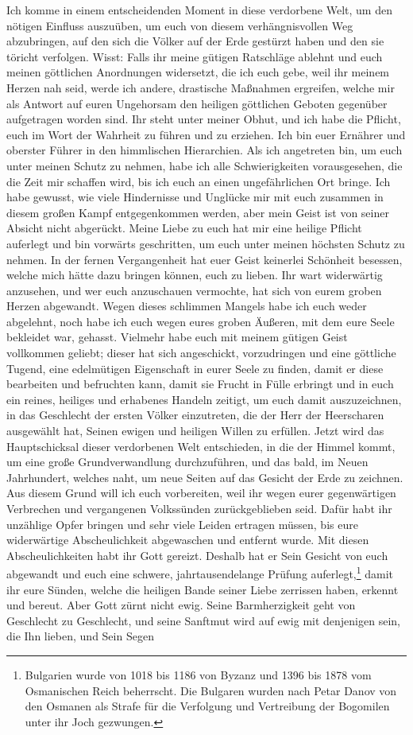 Ich komme in einem entscheidenden Moment in diese verdorbene Welt, um den nötigen Einfluss auszuüben, um euch von diesem verhängnisvollen Weg abzubringen, auf den sich die Völker auf der Erde gestürzt haben und den sie töricht verfolgen. Wisst: Falls ihr meine gütigen Ratschläge ablehnt und euch meinen göttlichen Anordnungen widersetzt, die ich euch gebe, weil ihr meinem Herzen nah seid, werde ich andere, drastische Maßnahmen ergreifen, welche mir als Antwort auf euren Ungehorsam den heiligen göttlichen Geboten gegenüber aufgetragen worden sind. Ihr steht unter meiner Obhut, und ich habe die Pflicht, euch im Wort der Wahrheit zu führen und zu erziehen. Ich bin euer Ernährer und oberster Führer in den himmlischen Hierarchien. Als ich angetreten bin, um euch unter meinen Schutz zu nehmen, habe ich alle Schwierigkeiten vorausgesehen, die die Zeit mir schaffen wird, bis ich euch an einen ungefährlichen Ort bringe. Ich habe gewusst, wie viele Hindernisse und Unglücke mir mit euch zusammen in diesem großen Kampf entgegenkommen werden, aber mein Geist ist von seiner Absicht nicht abgerückt. Meine Liebe zu euch hat mir eine heilige Pflicht auferlegt und bin vorwärts geschritten, um euch unter meinen höchsten Schutz zu nehmen. In der fernen Vergangenheit hat euer Geist keinerlei Schönheit besessen, welche mich hätte dazu bringen können, euch zu lieben. Ihr wart widerwärtig anzusehen, und wer euch anzuschauen vermochte, hat sich von eurem groben Herzen abgewandt. Wegen dieses schlimmen Mangels habe ich euch weder abgelehnt, noch habe ich euch wegen eures groben Äußeren, mit dem eure Seele bekleidet war, gehasst. Vielmehr habe euch mit meinem gütigen Geist vollkommen geliebt; dieser hat sich angeschickt, vorzudringen und eine göttliche Tugend, eine edelmütigen Eigenschaft in eurer Seele zu finden, damit er diese bearbeiten und befruchten kann, damit sie Frucht in Fülle erbringt und in euch ein reines, heiliges und erhabenes Handeln zeitigt, um euch damit auszuzeichnen, in das Geschlecht der ersten Völker einzutreten, die der Herr der Heerscharen ausgewählt hat, Seinen ewigen und heiligen Willen zu erfüllen. Jetzt wird das Hauptschicksal dieser verdorbenen Welt entschieden, in die der Himmel kommt, um eine große Grundverwandlung durchzuführen, und das bald, im Neuen Jahrhundert, welches naht, um neue Seiten auf das Gesicht der Erde zu zeichnen. Aus diesem Grund will ich euch vorbereiten, weil ihr wegen eurer gegenwärtigen Verbrechen und vergangenen Volkssünden zurückgeblieben seid. Dafür habt ihr unzählige Opfer bringen und sehr viele Leiden ertragen müssen, bis eure widerwärtige Abscheulichkeit abgewaschen und entfernt wurde. Mit diesen Abscheulichkeiten habt ihr Gott gereizt. Deshalb hat er Sein Gesicht von euch abgewandt und euch eine schwere, jahrtausendelange Prüfung auferlegt,\footnote{Bulgarien wurde von 1018 bis 1186 von Byzanz und 1396 bis 1878 vom Osmanischen Reich beherrscht. Die Bulgaren wurden nach Petar Danov von den Osmanen als Strafe für die Verfolgung und Vertreibung der Bogomilen unter ihr Joch gezwungen.} damit ihr eure Sünden, welche die heiligen Bande seiner Liebe zerrissen haben, erkennt und bereut. Aber Gott zürnt nicht ewig. Seine Barmherzigkeit geht von Geschlecht zu Geschlecht, und seine Sanftmut wird auf ewig mit denjenigen sein, die Ihn lieben, und Sein Segen 